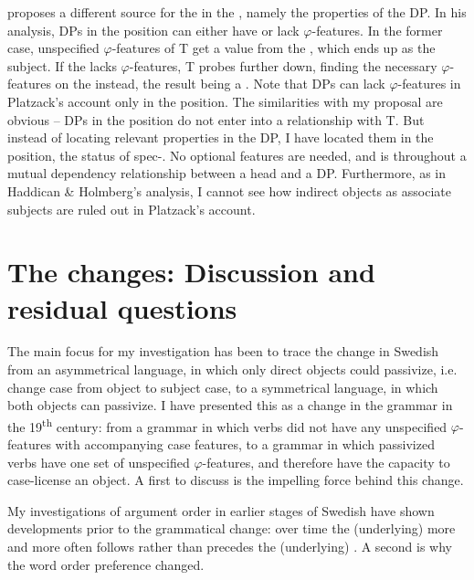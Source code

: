 \documentclass[output=paper]{langscibook}
\begin{document}
\citet{Platzack2005,Platzack2006} proposes a different source for the  in the , namely the properties of the  DP. In his analysis, DPs in the  position can either have or lack $\varphi ${}-features. In the former case, unspecified $\varphi ${}-features of T get a value from the , which ends up as the subject. If the  lacks $\varphi ${}-features, T probes further down, finding the necessary $\varphi ${}-features on the  instead, the result being a . Note that DPs can lack $\varphi ${}-features in Platzack’s account only in the  position. The similarities with my proposal are obvious – DPs in the  position do not enter into a relationship with T. But instead of locating relevant properties in the DP, I have located them in the position, the  status of spec-. No optional features are needed, and  is throughout a mutual dependency relationship between a head and a DP. Furthermore, as in Haddican \& Holmberg’s analysis, I cannot see how indirect objects as associate subjects are ruled out in Platzack’s account.


\section{The changes: Discussion and residual questions}\label{sec:falk:5}


The main focus for my investigation has been to trace the change in Swedish from an asymmetrical language, in which only direct objects could passivize, i.e. change case from object to subject case, to a symmetrical language, in which both objects can passivize. I have presented this as a change in the grammar in the 19\textsuperscript{th} century: from a grammar in which  verbs did not have any unspecified $\varphi ${}-features with accompanying case features, to a grammar in which passivized  verbs have one set of unspecified $\varphi ${}-features, and therefore have the capacity to case-license an object. A first  to discuss is the impelling force behind this change.


My investigations of argument order in earlier stages of Swedish have shown developments prior to the grammatical change: over time the (underlying)  more and more often follows rather than precedes the (underlying) . A second  is why the word order preference changed. 
\end{document}
